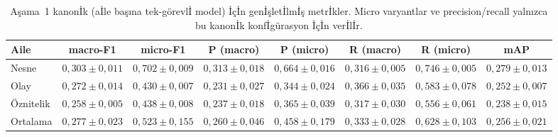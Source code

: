 \begin{table}[t]
  \caption{Aşama~1 kanon{\footnotesize İ}k (a{\footnotesize İ}le başına
    tek-görevl{\footnotesize İ} model) {\footnotesize İ}ç{\footnotesize İ}n
    gen{\footnotesize İ}şlet{\footnotesize İ}lm{\footnotesize İ}ş
    metr{\footnotesize İ}kler. Micro varyantlar ve precision/recall
    yalnızca bu kanon{\footnotesize İ}k konf{\footnotesize İ}gürasyon
    {\footnotesize İ}ç{\footnotesize İ}n ver{\footnotesize İ}l{\footnotesize İ}r.}
  \label{tab:phase1-extended}
  \centering
  \footnotesize
  \setlength{\tabcolsep}{4pt}
  \begin{tabular}{lccccccc}
    \toprule
    Aile     & macro-F1 & micro-F1 & P (macro) & P (micro) & R (macro) & R (micro) & mAP \\
    \midrule
    Nesne    & $0{,}303 \pm 0{,}011$ & $0{,}702 \pm 0{,}009$ & $0{,}313 \pm 0{,}018$ & $0{,}664 \pm 0{,}016$ & $0{,}316 \pm 0{,}005$ & $0{,}746 \pm 0{,}005$ & $0{,}279 \pm 0{,}013$ \\
    Olay     & $0{,}272 \pm 0{,}014$ & $0{,}430 \pm 0{,}007$ & $0{,}231 \pm 0{,}027$ & $0{,}344 \pm 0{,}024$ & $0{,}366 \pm 0{,}035$ & $0{,}583 \pm 0{,}078$ & $0{,}252 \pm 0{,}007$ \\
    Öznitelik & $0{,}258 \pm 0{,}005$ & $0{,}438 \pm 0{,}008$ & $0{,}237 \pm 0{,}018$ & $0{,}365 \pm 0{,}039$ & $0{,}317 \pm 0{,}030$ & $0{,}556 \pm 0{,}061$ & $0{,}238 \pm 0{,}015$ \\
    \midrule
    Ortalama & $0{,}277 \pm 0{,}023$ & $0{,}523 \pm 0{,}155$ & $0{,}260 \pm 0{,}046$ & $0{,}458 \pm 0{,}179$ & $0{,}333 \pm 0{,}028$ & $0{,}628 \pm 0{,}103$ & $0{,}256 \pm 0{,}021$ \\
    \bottomrule
  \end{tabular}
\end{table}
